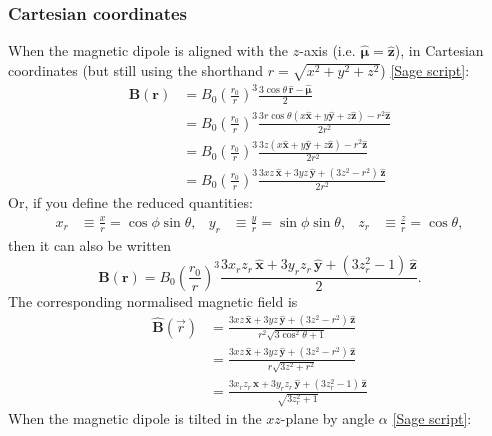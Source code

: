 \documentclass{book}
\newcommand{\unitvec}[1]{\hat{\pmb{#1}}}
\newcommand{\linktosage}[1]{\hyperref[#1]{[Sage script]}}
\begin{document}
\subsubsection{Cartesian coordinates}

When the magnetic dipole is aligned with the $z$-axis (i.e. $\unitvec{\mu} = \unitvec{z}$), in Cartesian coordinates (but still using the shorthand $r = \sqrt{x^2 + y^2 + z^2}$) \linktosage{sage:Bdip_aligned}:
\begin{equation}
\begin{aligned}
    \pmb{B}(\pmb{r})
        &= B_0\left(\frac{r_0}{r}\right)^3\frac{3\cos\theta\,\unitvec{r} - \unitvec{\mu}}{2} \\
        &= B_0\left(\frac{r_0}{r}\right)^3\frac{3r\cos\theta (x\unitvec{x} + y\unitvec{y} + z\unitvec{z}) - r^2\unitvec{z}}{2r^2} \\
        &= B_0\left(\frac{r_0}{r}\right)^3\frac{3z(x\unitvec{x} + y\unitvec{y} + z\unitvec{z}) - r^2\unitvec{z}}{2r^2} \\
        &= B_0\left(\frac{r_0}{r}\right)^3\frac{3xz\,\unitvec{x} + 3yz\,\unitvec{y} + (3z^2 - r^2)\,\unitvec{z}}{2r^2}
\end{aligned}
\end{equation}
Or, if you define the reduced quantities:
\begin{align}
    x_r &\equiv \frac{x}{r} = \cos\phi\sin\theta, &
    y_r &\equiv \frac{y}{r} = \sin\phi\sin\theta, &
    z_r &\equiv \frac{z}{r} = \cos\theta,
\end{align}
then it can also be written
\begin{equation}
    \pmb{B}(\pmb{r})
        = B_0\left(\frac{r_0}{r}\right)^3\frac{3 x_r z_r \,\unitvec{x} + 3 y_r z_r \,\unitvec{y} + (3 z_r^2 - 1)\,\unitvec{z}}{2}.
\end{equation}
The corresponding normalised magnetic field is
\begin{equation}
\begin{aligned}
    \unitvec{B}(\vec{r})
        &= \frac{3xz\,\unitvec{x} + 3yz\,\unitvec{y} + (3z^2 - r^2)\,\unitvec{z}}{r^2\sqrt{3\cos^2\theta + 1}} \\
        &= \frac{3xz\,\unitvec{x} + 3yz\,\unitvec{y} + (3z^2 - r^2)\,\unitvec{z}}{r\sqrt{3z^2 + r^2}} \\
        &= \frac{3 x_r z_r \, \unitvec{x} + 3 y_r z_r \,\unitvec{y} + (3 z_r^2 - 1)\,\unitvec{z}}{\sqrt{3z_r^2 + 1}}
\end{aligned}
\end{equation}
When the magnetic dipole is tilted in the $xz$-plane by angle $\alpha$ \linktosage{sage:Bdip_inclined}:
\end{document}

